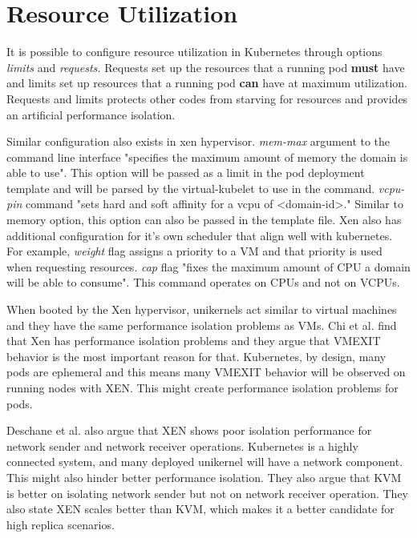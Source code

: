 \section{Resource Utilization}

It is possible to configure resource utilization in Kubernetes through options \textit{limits} and \textit{requests.} Requests set up the resources that a running pod \textbf{must} have and limits set up resources that a running pod \textbf{can} have at maximum utilization. Requests and limits protects other codes from starving for resources and provides an artificial performance isolation.

Similar configuration also exists in xen hypervisor. \textit{mem-max} argument to the command line interface "specifies the maximum amount of memory the domain is able to use". \cite{xl-man-page} This option will be passed as a limit in the pod deployment template and will be parsed by the virtual-kubelet to use in the command. \textit{vcpu-pin} command "sets hard and soft affinity for a vcpu of <domain-id>." \cite{xl-man-page} Similar to memory option, this option can also be passed in the template file. Xen also has additional configuration for it's own scheduler that align well with kubernetes. For example, \textit{weight} flag assigns a priority to a VM and that priority is used when requesting resources. \textit{cap} flag "fixes the maximum amount of CPU a domain will be able to consume". This command operates on CPUs and not on VCPUs.

When booted by the Xen hypervisor, unikernels act similar to virtual machines and they have the same performance isolation problems as VMs. Chi  et al.\cite{performance-isolation} find that Xen has performance isolation problems and they argue that VMEXIT behavior is the most important reason for that. Kubernetes, by design, many pods are ephemeral and this means many VMEXIT behavior will be observed on running nodes with XEN. This might create performance isolation problems for pods.

Deschane et al. \cite{Deshane} also argue that XEN shows poor isolation performance for network sender and network receiver operations. Kubernetes is a highly connected system, and many deployed unikernel will have a network component. This might also hinder better performance isolation. They also argue that KVM is better on isolating network sender but not on network receiver operation. They also state XEN scales better than KVM, which makes it a better candidate for high replica scenarios.